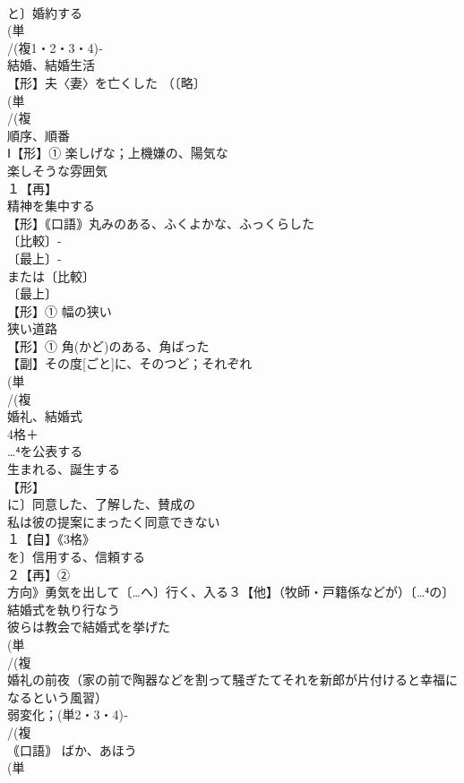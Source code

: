 \documentclass[8pt]{extreport}
\begin{document}
\begin{CJK}{UTF8}{min}
\\	と〕婚約する
\\	(単
\\	/(複1・2・3・4)‐
\\	結婚、結婚生活 
\\	【形】夫〈妻〉を亡くした （〔略〕
\\	(単
\\	/(複
\\	順序、順番 
\\	Ⅰ【形】① 楽しげな；上機嫌の、陽気な 
\\	楽しそうな雰囲気
\\	１【再】
\\	精神を集中する 
\\	【形】｟口語｠丸みのある、ふくよかな、ふっくらした 
\\	〔比較〕-
\\	〔最上〕-
\\	または〔比較〕
\\	〔最上〕
\\	【形】① 幅の狭い 
\\	狭い道路
\\	【形】① 角(かど)のある、角ばった
\\	【副】その度[ごと]に、そのつど；それぞれ
\\	(単
\\	/(複
\\	婚礼、結婚式 
\\	4格＋
\\	…⁴を公表する
\\	生まれる、誕生する
\\	【形】
\\	に〕同意した、了解した、賛成の 
\\	私は彼の提案にまったく同意できない
\\	１【自】《3格》
\\	を〕信用する、信頼する 
\\	２【再】②
\\	方向》勇気を出して〔…へ〕行く、入る３【他】（牧師・戸籍係などが）〔…⁴の〕結婚式を執り行なう 
\\	彼らは教会で結婚式を挙げた
\\	(単
\\	/(複
\\	婚礼の前夜（家の前で陶器などを割って騒ぎたてそれを新郎が片付けると幸福になるという風習） 
\\	弱変化；(単2・3・4)‐
\\	/(複
\\	｟口語｠ ばか、あほう 
\\	(単

\end{CJK}
\end{document}
